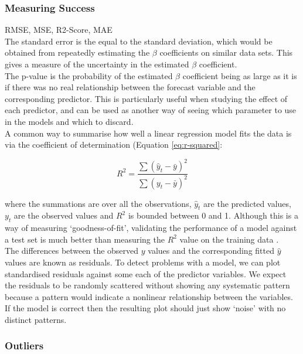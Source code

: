 \subsubsection{Measuring Success}

RMSE, MSE, R2-Score, MAE \\

The standard error is the equal to the standard deviation, which would be obtained from repeatedly estimating the $\beta$ coefficients on similar data sets. This gives a measure of the uncertainty in the estimated $\beta$ coefficient. \\

The p-value is the probability of the estimated $\beta$ coefficient being as large as it is if there was no real relationship between the forecast variable and the corresponding predictor. This is particularly useful when studying the effect of each predictor, and can be used as another way of seeing which parameter to use in the models and which to discard. \\ 

A common way to summarise how well a linear regression model fits the data is via the coefficient of determination (Equation \ref{eq:r-squared}:

\begin{equation}
    R^2 = \frac{\sum(\hat y_t - \bar y)^2}{\sum(y_t - \bar y)^2}
    \label{eq:r-squared}
\end{equation}

where the summations are over all the observations, $\hat y_t$ are the predicted values, $y_t$ are the observed values and $R^2$ is bounded between 0 and 1. Although this is a way of measuring `goodness-of-fit', validating the performance of a model against a test set is much better than measuring the $R^2$ value on the training data \cite{forecasting-book}. \\

The differences between the observed $y$ values and the corresponding fitted $\hat y$ values are known as residuals. To detect problems with a model, we can plot standardised residuals against some each of the predictor variables. We expect the residuals to be randomly scattered without showing any systematic pattern because a pattern would indicate a nonlinear relationship between the variables. If the model is correct then the resulting plot should just show `noise' with no distinct patterns. 

\subsubsection{Outliers}

